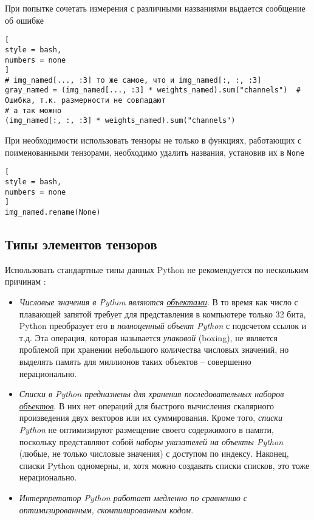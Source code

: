 \documentclass[%
	11pt,
	a4paper,
	utf8,
		]{article}
\begin{document}
При попытке сочетать измерения с различными названиями выдается сообщение об ошибке
\begin{lstlisting}[
style = bash,
numbers = none
]
# img_named[..., :3] то же самое, что и img_named[:, :, :3]
gray_named = (img_named[..., :3] * weights_named).sum("channels")  # Ошибка, т.к. размерности не совпадают
# а так можно
(img_named[:, :, :3] * weights_named).sum("channels")
\end{lstlisting}

При необходимости использовать тензоры не только в функциях, работающих с поименованными тензорами, необходимо удалить названия, установив их в \verb|None|
\begin{lstlisting}[
style = bash,
numbers = none
]
img_named.rename(None)
\end{lstlisting}

\subsection{Типы элементов тензоров}

Использовать стандартные типы данных Python не рекомендуется по нескольким причинам \cite[]{pytorch-2022}:
\begin{itemize}
	\item \emph{Числовые значения в Python являются \underline{объектами}}. В то время как число с плавающей запятой требует для представления в компьютере только 32 бита, Python преобразует его в \emph{\color{red}полноценный объект Python} с подсчетом ссылок и т.д. Эта операция, которая называется \emph{упаковой} (boxing), не является проблемой при хранении небольшого количества числовых значений, но выделять память для миллионов таких объектов -- совершенно нерационально.
	
	\item \emph{Списки в Python предназнены для хранения последовательных наборов \underline{объектов}}. В них нет операций для быстрого вычисления скалярного произведения двух векторов или их суммирования. Кроме того, \emph{списки Python} не оптимизируют размещение своего содержимого в памяти, поскольку представляют собой \emph{наборы указателей на объекты Python} (любые, не только числовые значения) с доступом по индексу. Наконец, списки Python одномерны, и, хотя можно создавать списки списков, это тоже нерационально.
	
	\item \emph{Интерпретатор Python работает медленно по сравнению с оптимизированным, скомпилированным кодом}.
\end{itemize}
\end{document}
